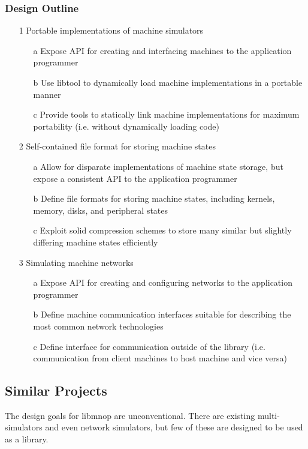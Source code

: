 \documentclass[12pt]{article}
\begin{document}
\subsubsection*{Design Outline}
\begin{enumerate}
\item[1] Portable implementations of machine simulators
\begin{enumerate}
\item[a] Expose API for creating and interfacing machines to the application programmer
\item[b] Use libtool to dynamically load machine implementations in a portable manner
\item[c] Provide tools to statically link machine implementations for maximum portability (i.e. without dynamically loading code)
\end{enumerate}
\item[2] Self-contained file format for storing machine states
\begin{enumerate}
\item[a] Allow for disparate implementations of machine state storage, but expose a consistent API to the application programmer
\item[b] Define file formats for storing machine states, including kernels, memory, disks, and peripheral states
\item[c] Exploit solid compression schemes to store many similar but slightly differing machine states efficiently
\end{enumerate}
\item[3] Simulating machine networks
\begin{enumerate}
\item[a] Expose API for creating and configuring networks to the application programmer
\item[b] Define machine communication interfaces suitable for describing the most common network technologies
\item[c] Define interface for communication outside of the library (i.e. communication from client machines to host machine and vice versa)
\end{enumerate}
\end{enumerate}

\subsection*{Similar Projects}
The design goals for libmnop are unconventional. There are existing multi-simulators and even network simulators, but few of these are designed to be used as a library.
\end{document}
